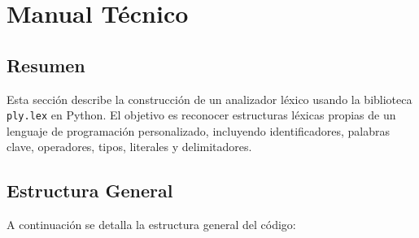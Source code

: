 \documentclass{article}
\begin{document}

\section{Manual Técnico}\label{sec:man_t}

\subsection{Resumen}

Esta sección describe la construcción de un analizador léxico usando la biblioteca \texttt{ply.lex} en Python. El objetivo es reconocer estructuras léxicas propias de un lenguaje de programación personalizado, incluyendo identificadores, palabras clave, operadores, tipos, literales y delimitadores.

\subsection{Estructura General}

A continuación se detalla la estructura general del código:
\end{document}
